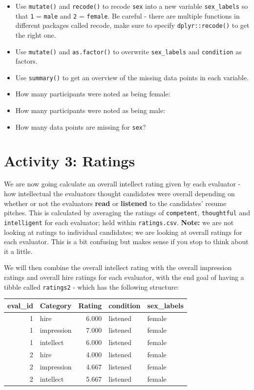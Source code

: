 \documentclass[]{book}
\begin{document}
\begin{itemize}
\item
  Use \texttt{mutate()} and \texttt{recode()} to recode \texttt{sex} into a new variable \texttt{sex\_labels} so that \texttt{1} = \texttt{male} and \texttt{2} = \texttt{female}. Be careful - there are multiple functions in different packages called recode, make sure to specify \texttt{dplyr::recode()} to get the right one.
\item
  Use \texttt{mutate()} and \texttt{as.factor()} to overwrite \texttt{sex\_labels} and \texttt{condition} as factors.\\
\item
  Use \texttt{summary()} to get an overview of the missing data points in each variable.
\item
  How many participants were noted as being female: 
\item
  How many participants were noted as being male: 
\item
  How many data points are missing for \texttt{sex}? 
\end{itemize}

\hypertarget{activity-3-ratings}{%
\section{Activity 3: Ratings}\label{activity-3-ratings}}

We are now going calculate an overall intellect rating given by each evaluator - how intellectual the evaluators thought candidates were overall depending on whether or not the evaluators \textbf{read} or \textbf{listened} to the candidates' resume pitches. This is calculated by averaging the ratings of \texttt{competent}, \texttt{thoughtful} and \texttt{intelligent} for each evaluator; held within \texttt{ratings.csv}. \textbf{Note:} we are not looking at ratings to individual candidates; we are looking at overall ratings for each evaluator. This is a bit confusing but makes sense if you stop to think about it a little.

We will then combine the overall intellect rating with the overall impression ratings and overall hire ratings for each evaluator, with the end goal of having a tibble called \texttt{ratings2} - which has the following structure:

\begin{tabular}{r|l|r|l|l}
\hline
eval\_id & Category & Rating & condition & sex\_labels\\
\hline
1 & hire & 6.000 & listened & female\\
\hline
1 & impression & 7.000 & listened & female\\
\hline
1 & intellect & 6.000 & listened & female\\
\hline
2 & hire & 4.000 & listened & female\\
\hline
2 & impression & 4.667 & listened & female\\
\hline
2 & intellect & 5.667 & listened & female\\
\hline
\end{tabular}
\end{document}

